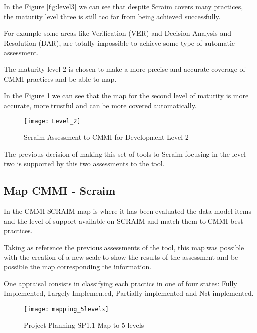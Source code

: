 In the Figure \ref{fig:level3} we can see that despite Scraim covers many practices, the maturity level three is still too far from being achieved successfully.

For example some areas like Verification (VER) and Decision Analysis and Resolution (DAR), are totally impossible to achieve some type of automatic assessment.

The maturity level 2 is chosen to make a more precise and accurate coverage of CMMI practices and be able to map.

In the Figure \ref{fig:level2} we can see that the map for the second level of maturity is more accurate, more trustful and can be more covered automatically.
	
\begin{figure}[h]
	\begin{center}
		\leavevmode
		\texttt{[image: Level\_2]}
		\caption{Scraim Assessment to CMMI for Development Level 2}
		\label{fig:level2}
	\end{center}
\end{figure}

The previous decision of making this set of tools to Scraim focusing in the level two is supported by this two assessments to the tool.



\subsection{Map CMMI - Scraim} \label{sec:mapping}
In the CMMI-SCRAIM map is where it has been evaluated the data model items and the level of support available on SCRAIM and match them to CMMI best practices.

Taking as reference the previous assessments of the tool, this map was possible with the creation of a new scale to show the results of the assessment and be possible the map corresponding the information.

One appraisal consists in classifying each practice in one of four states: Fully Implemented, Largely Implemented, Partially implemented and Not implemented.

\begin{figure}[h]
	\begin{center}
		\leavevmode
		\texttt{[image: mapping\_5levels]}
		\caption{Project Planning SP1.1 Map to 5 levels}
		\label{fig:mapping_5levels}
	\end{center}
\end{figure}

